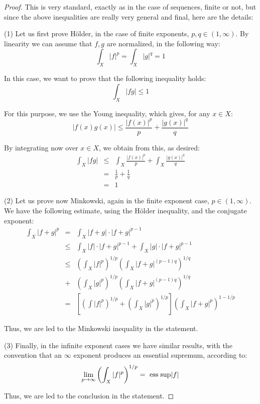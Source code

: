 \documentclass[12pt]{amsbook}
\begin{document}
\begin{proof}
This is very standard, exactly as in the case of sequences, finite or not, but since the above inequalities are really very general and final, here are the details:

\medskip

(1) Let us first prove H\"older, in the case of finite exponents, $p,q\in(1,\infty)$. By linearity we can assume that $f,g$ are normalized, in the following way:
$$\int_X|f|^p=\int_X|g|^q=1$$

In this case, we want to prove that the following inequality holds:
$$\int_X|fg|\leq1$$

For this purpose, we use the Young inequality, which gives, for any $x\in X$:
$$|f(x)g(x)|\leq\frac{|f(x)|^p}{p}+\frac{|g(x)|^q}{q}$$

By integrating now over $x\in X$, we obtain from this, as desired:
\begin{eqnarray*}
\int_X|fg|
&\leq&\int_X\frac{|f(x)|^p}{p}+\int_X\frac{|g(x)|^q}{q}\\
&=&\frac{1}{p}+\frac{1}{q}\\
&=&1
\end{eqnarray*}

(2) Let us prove now Minkowski, again in the finite exponent case, $p\in(1,\infty)$. We have the following estimate, using the H\"older inequality, and the conjugate exponent:
\begin{eqnarray*}
\int_X|f+g|^p
&=&\int_X|f+g|\cdot|f+g|^{p-1}\\
&\leq&\int_X|f|\cdot|f+g|^{p-1}+\int_X|g|\cdot|f+g|^{p-1}\\
&\leq&\left(\int_X|f|^p\right)^{1/p}\left(\int_X|f+g|^{(p-1)q}\right)^{1/q}\\
&+&\left(\int_X|g|^p\right)^{1/p}\left(\int_X|f+g|^{(p-1)q}\right)^{1/q}\\
&=&\left[\left(\int|f|^p\right)^{1/p}+\left(\int_X|g|^p\right)^{1/p}\right]\left(\int_X|f+g|^p\right)^{1-1/p}
\end{eqnarray*}

Thus, we are led to the Minkowski inequality in the statement.

\medskip

(3) Finally, in the infinite exponent cases we have similar results, with the convention that an $\infty$ exponent produces an essential supremum, according to:
$$\lim_{p\to\infty}\left(\int_X|f|^p\right)^{1/p}=\ {\rm ess\;sup}|f|$$

Thus, we are led to the conclusion in the statement.
\end{proof}
\end{document}
